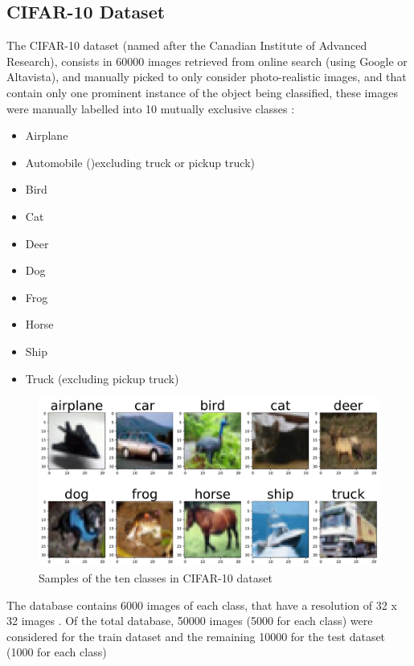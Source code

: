\documentclass[10pt,twocolumn,letterpaper]{article}
\begin{document}
\subsection{CIFAR-10 Dataset}

The CIFAR-10 dataset (named after the Canadian Institute of Advanced Research), consists in 60000 images retrieved from online search (using Google or Altavista), and manually picked to only consider photo-realistic images, and that contain only one prominent instance of the object being classified, these images were manually labelled into 10 mutually exclusive classes \cite{Krizhevsky2017}: 

\begin{itemize}
	\item Airplane
	\item Automobile ()excluding truck or pickup truck)
	\item Bird
	\item Cat
	\item Deer
	\item Dog
	\item Frog
	\item Horse
	\item Ship
	\item Truck (excluding pickup truck)
\end{itemize}

\begin{figure}[h]
	\begin{center}
		\includegraphics[width=1.0\linewidth]{samples_images.pdf}
	\end{center}
	\caption{Samples of the ten classes in CIFAR-10 dataset}
	\label{fig:samples}
\end{figure}

The database contains 6000 images of each class, that have a resolution of 32 x 32 images . Of the total database, 50000 images (5000 for each class) were considered for the train dataset and the remaining 10000 for the test dataset (1000 for each class)
\end{document}
